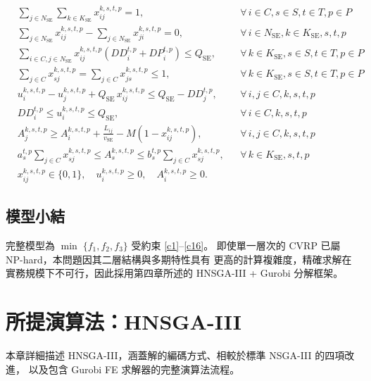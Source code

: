\documentclass[11pt, a4paper]{article}
\newcommand{\KSE}{K_{\mathrm{SE}}}
\newcommand{\NSE}{N_{\mathrm{SE}}}
\newcommand{\QSE}{Q_{\mathrm{SE}}}
\newcommand{\vSE}{v_{\mathrm{SE}}}
\numberwithin{equation}{section}
\begin{document}
\begin{align}
  &\sum_{j\in\NSE}\sum_{k\in\KSE}x_{ij}^{k,s,t,p}=1,
  &&\forall\,i\in C,s\in S,t\in T,p\in P
  \tag{C9}\label{c9}\\
  &\sum_{j\in\NSE}x_{ij}^{k,s,t,p}-\sum_{j\in\NSE}x_{ji}^{k,s,t,p}=0,
  &&\forall\,i\in\NSE,k\in\KSE,s,t,p
  \tag{C10}\label{c10}\\
  &\sum_{i\in C,j\in\NSE}x_{ij}^{k,s,t,p}(DD_i^{t,p}+DP_i^{t,p})\le\QSE,
  &&\forall\,k\in\KSE,s\in S,t\in T,p\in P
  \tag{C11}\label{c11}\\
  &\sum_{j\in C}x_{sj}^{k,s,t,p}=\sum_{j\in C}x_{js}^{k,s,t,p}\le 1,
  &&\forall\,k\in\KSE,s\in S,t\in T,p\in P
  \tag{C12}\label{c12}\\
  &u_i^{k,s,t,p}-u_j^{k,s,t,p}+\QSE\,x_{ij}^{k,s,t,p}\le\QSE-DD_j^{t,p},
  &&\forall\,i,j\in C,k,s,t,p
  \tag{C13a}\label{c13a}\\
  &DD_i^{t,p}\le u_i^{k,s,t,p}\le\QSE,
  &&\forall\,i\in C,k,s,t,p
  \tag{C13b}\label{c13b}\\
  &A_j^{k,s,t,p}\ge A_i^{k,s,t,p}+\frac{L_{ij}}{\vSE}
    -M(1-x_{ij}^{k,s,t,p}),
  &&\forall\,i,j\in C,k,s,t,p
  \tag{C14}\label{c14}\\
  &a_s^{t,p}\sum_{j\in C}x_{sj}^{k,s,t,p}\le A_s^{k,s,t,p}
    \le b_s^{t,p}\sum_{j\in C}x_{sj}^{k,s,t,p},
  &&\forall\,k\in\KSE,s,t,p
  \tag{C15}\label{c15}\\
  &x_{ij}^{k,s,t,p}\in\{0,1\},\quad
  u_i^{k,s,t,p}\ge 0,\quad
  A_i^{k,s,t,p}\ge 0.
  \tag{C16}\label{c16}
\end{align}

\subsection{模型小結}

完整模型為 $\min\;\{f_1,f_2,f_3\}$ 受約束 \eqref{c1}--\eqref{c16}。
即使單一層次的 CVRP 已屬 NP-hard，本問題因其二層結構與多期特性具有
更高的計算複雜度，精確求解在實務規模下不可行，因此採用第四章所述的
HNSGA-III + Gurobi 分解框架。

\section{所提演算法：HNSGA-III}
\label{sec:alg}

本章詳細描述 HNSGA-III，涵蓋解的編碼方式、相較於標準 NSGA-III 的四項改進，
以及包含 Gurobi FE 求解器的完整演算法流程。
\end{document}
